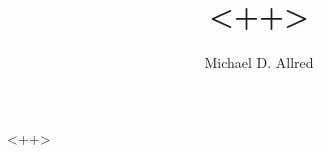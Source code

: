 \documentclass[aspectratio=169]{beamer}
\title{<++>}
\author{Michael D. Allred}
\begin{document}
\maketitle

<++>
\end{document}
